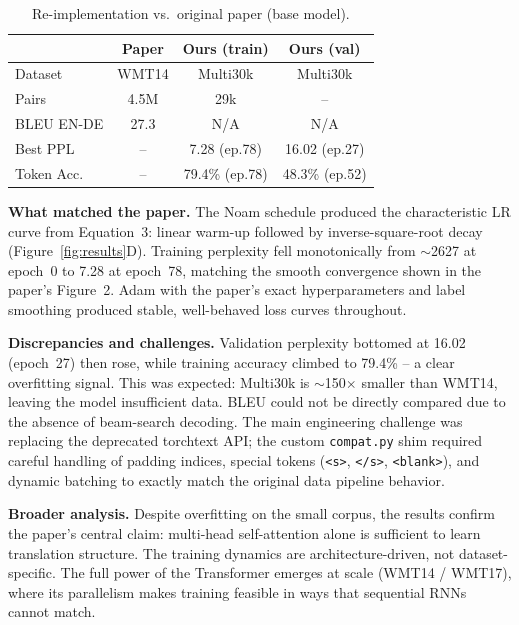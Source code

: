 \documentclass[10pt,twocolumn]{article}
\begin{document}
\begin{table}[h]
  \centering
  \caption{Re-implementation vs.\ original paper (base model).}
  \label{tab:compare}
  \small
  \setlength{\tabcolsep}{4pt}
  \begin{tabular}{lccc}
    \toprule
    & \textbf{Paper} & \textbf{Ours (train)} & \textbf{Ours (val)} \\
    \midrule
    Dataset      & WMT14     & Multi30k       & Multi30k \\
    Pairs        & 4.5M      & 29k            & --       \\
    BLEU EN-DE   & 27.3      & N/A            & N/A      \\
    Best PPL     & --        & 7.28 (ep.78)   & 16.02 (ep.27) \\
    Token Acc.   & --        & 79.4\% (ep.78) & 48.3\% (ep.52) \\
    \bottomrule
  \end{tabular}
\end{table}

\textbf{What matched the paper.}
The Noam schedule produced the characteristic LR curve from Equation~3:
linear warm-up followed by inverse-square-root decay (Figure~\ref{fig:results}D).
Training perplexity fell monotonically from $\sim$2627 at epoch~0 to 7.28 at
epoch~78, matching the smooth convergence shown in the paper's Figure~2.
Adam with the paper's exact hyperparameters and label smoothing produced
stable, well-behaved loss curves throughout.

\textbf{Discrepancies and challenges.}
Validation perplexity bottomed at 16.02 (epoch~27) then rose, while training
accuracy climbed to 79.4\% -- a clear overfitting signal. This was
expected: Multi30k is $\sim$150$\times$ smaller than WMT14, leaving the
model insufficient data. BLEU could not be directly compared due to the
absence of beam-search decoding. The main engineering challenge was
replacing the deprecated torchtext API; the custom \texttt{compat.py}
shim required careful handling of padding indices, special tokens
(\texttt{<s>}, \texttt{</s>}, \texttt{<blank>}), and dynamic batching to
exactly match the original data pipeline behavior.

\textbf{Broader analysis.}
Despite overfitting on the small corpus, the results confirm the paper's
central claim: multi-head self-attention alone is sufficient to learn
translation structure. The training dynamics are architecture-driven, not
dataset-specific. The full power of the Transformer emerges at scale
(WMT14 / WMT17), where its parallelism makes training feasible in ways
that sequential RNNs cannot match.
\end{document}

